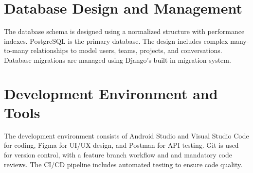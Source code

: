 \section{Database Design and Management}
The database schema is designed using a normalized structure with performance indexes. PostgreSQL is the primary database. The design includes complex many-to-many relationships to model users, teams, projects, and conversations. Database migrations are managed using Django's built-in migration system.

\section{Development Environment and Tools}
The development environment consists of Android Studio and Visual Studio Code for coding, Figma for UI/UX design, and Postman for API testing. Git is used for version control, with a feature branch workflow and and mandatory code reviews. The CI/CD pipeline includes automated testing to ensure code quality.